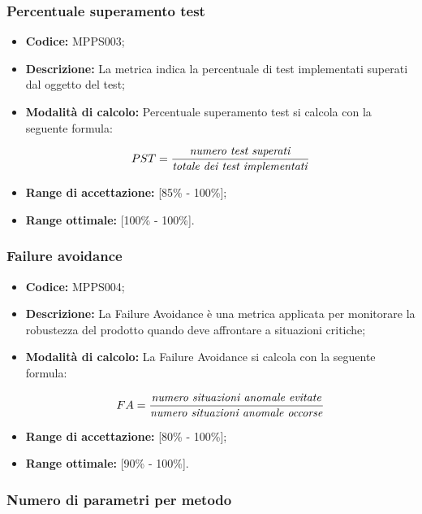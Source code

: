 \documentclass[../NormediProgetto.tex]{subfiles}
\begin{document}
\subsubsection{Percentuale superamento test}

\begin{itemize}
	\item \textbf{Codice:} MPPS003;
	\item \textbf{Descrizione:} La metrica indica la percentuale di test implementati superati dal oggetto del test;
	\item \textbf{Modalità di calcolo:} Percentuale superamento test si calcola con la seguente formula:
	
	\[ PST = \frac{\textrm{\textit{numero test superati}}}{\textrm{\textit{totale dei test implementati}}} \]
	
	\item \textbf{Range di accettazione:} [85\% - 100\%];
	\item \textbf{Range ottimale:} [100\% - 100\%].
\end{itemize}

\subsubsection{Failure avoidance}

\begin{itemize}
	\item \textbf{Codice:} MPPS004;
	\item \textbf{Descrizione:} La Failure Avoidance è una metrica applicata per monitorare la robustezza del prodotto quando deve affrontare a situazioni critiche;
	\item \textbf{Modalità di calcolo:} La Failure Avoidance si calcola con la seguente formula:
	
	\[ FA = \frac{\textrm{\textit{numero situazioni anomale evitate}}}{\textrm{\textit{numero situazioni anomale occorse}}} \]
	
	\item \textbf{Range di accettazione:} [80\% - 100\%];
	\item \textbf{Range ottimale:} [90\% - 100\%].
\end{itemize}

\subsubsection{Numero di parametri per metodo}
\end{document}
